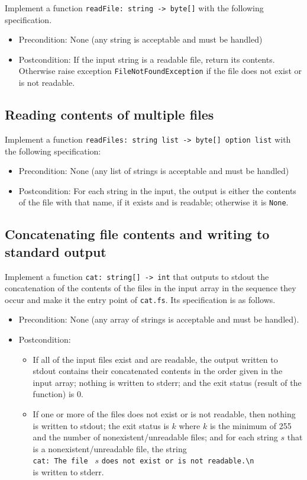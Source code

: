 \documentclass[a4paper,11pt]{article}
\begin{document}
Implement a function \texttt{readFile: string -> byte[]} with the following specification. 
\begin{itemize}
\item Precondition: None (any string is acceptable and must be handled)
\item Postcondition: If the input string is a readable file, return its contents.  Otherwise raise exception \texttt{FileNotFoundException} if the file does not exist or is not readable.
\end{itemize}

\subsection{Reading contents of multiple files}
 
Implement a function \texttt{readFiles: string list -> byte[] option list} with the following specification:
\begin{itemize}
\item Precondition: None (any list of strings is acceptable and must be handled)
\item Postcondition: For each string in the input, the output is either the contents of the file with that name, if it exists and is readable; otherwise it is \texttt{None}.  
\end{itemize}

\subsection{Concatenating file contents and writing to standard output}

Implement a function \texttt{cat: string[] -> int} that outputs to stdout the concatenation of the contents of the files in the input array in the sequence they occur and make it the entry point of \texttt{cat.fs}. Its specification is as follows.
\begin{itemize}
\item Precondition: None (any array of strings is acceptable and must be handled).
\item Postcondition: 
\begin{itemize}
\item If all of the input files exist and are readable, the output written to stdout contains their concatenated contents in the order given in the input array; nothing is written to stderr; and the exit status (result of the function) is $0$.  
\item If one or more of the files does not exist or is not readable, then
nothing is written to stdout; the exit status is $k$ where $k$ is the minimum of 255 and the number of nonexistent/unreadable files; and for each string $s$ that is a nonexistent/unreadable file, the string \\ \verb|cat: The file | $s$ \verb|does not exist or is not readable.\n| \\ is written to stderr.
\end{itemize}
\end{itemize} 
\end{document}
